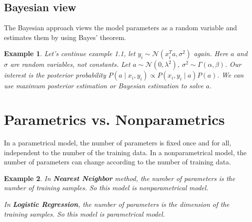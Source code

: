 \documentclass[11pt]{article}
\def\MN{{\mathcal N}}
\newtheorem{example}{Example}[section]
\begin{document}
\subsection{Bayesian view}
The Bayesian approach views the model parameters as a random variable and  estimates them by using Bayes' theorem.

\begin{example}
Let's continue example 1.1, let $y_i \sim \MN(x_i^T a, \sigma^2)$ again. Here $a$ and $\sigma$ are random variables, not constants. Let $a \sim \MN(0, \lambda^2)$, $\sigma^2 \sim \Gamma(\alpha, \beta)$.
Our interest is the posterior probability $P(a\mid x_i, y_i) \propto P(x_i, y_i\mid a)P(a)$. We can use maximum posterior estimation or Bayesian estimation to solve $a$.
\end{example}


\section{Parametrics vs. Nonparametrics}
In a parametrical model, the number of parameters is fixed once and for all, independent to the number of the training data.
In a nonparametrical model, the number of parameters can change according to the number of training data.

\begin{example}
In \textbf{Nearest Neighbor} method, the number of parameters is the number of training samples. So this model is nonparametrical model.

In \textbf{Logistic Regression}, the number of parameters is the dimension of the training samples. So this model is parametrical model.
\end{example}
\end{document}
